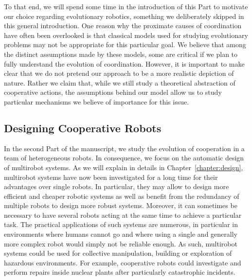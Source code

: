 
    To that end, we will spend some time in the introduction of this Part to motivate our choice regarding evolutionary robotics, something we deliberately skipped in this general introduction. One reason why the proximate causes of coordination have often been overlooked is that classical models used for studying evolutionary problems may not be appropriate for this particular goal. We believe that among the distinct assumptions made by these models, some are critical if we plan to fully understand the evolution of coordination. However, it is important to make clear that we do not pretend our approach to be a more realistic depiction of nature. Rather we claim that, while we still study a theoretical abstraction of cooperative actions, the assumptions behind our model allow us to study particular mechanisms we believe of importance for this issue.


  \subsection{Designing Cooperative Robots}

    In the second Part of the manuscript, we study the evolution of cooperation in a team of heterogeneous robots. In consequence, we focus on the automatic design of multirobot systems. As we will explain in details in Chapter~\ref{chapter:design}, multirobot systems have now been investigated for a long time for their advantages over single robots. In particular, they may allow to design more efficient and cheaper robotic systems as well as benefit from the redundancy of multiple robots to design more robust systems. Moreover, it can sometimes be necessary to have several robots acting at the same time to achieve a particular task. The practical applications of such systems are numerous, in particular in environments where humans cannot go and where using a single and generally more complex robot would simply not be reliable enough. As such, multirobot systems could be used for collective manipulation, building or exploration of hazardous environments. For example, cooperative robots could investigate and perform repairs inside nuclear plants after particularly catastrophic incidents.

